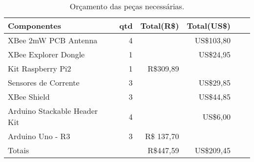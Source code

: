\begin{table}
\centering
{\renewcommand{\arraystretch}{1.5}
\renewcommand{\tabcolsep}{0.2cm}
\begin{tabular}{|l|r|r|r|r|r|}
\hline
Componentes & qtd & Total(R\$) & Total(US\$) \\
\hline
XBee 2mW PCB Antenna & 4 & {} & US\$103,80 \\
XBee Explorer Dongle & 1 & {} & US\$24,95 \\
Kit Raspberry Pi2 & 1 & R\$309,89 & {} \\
Sensores de Corrente & 3 & {} & US\$29,85 \\
XBee Shield & 3 & {} & US\$44,85 \\
Arduino Stackable Header Kit & 4 & {} & US\$6,00 \\
Arduino Uno - R3 & 3 & R\$ 137,70 & {} \\
\hline
\multicolumn{2}{|l|}{Totais} & R\$447,59 & US\$209,45 \\
\hline
\end{tabular}}
\caption{\label{tab:orcamento} Orçamento das peças necessárias.}
\end{table}